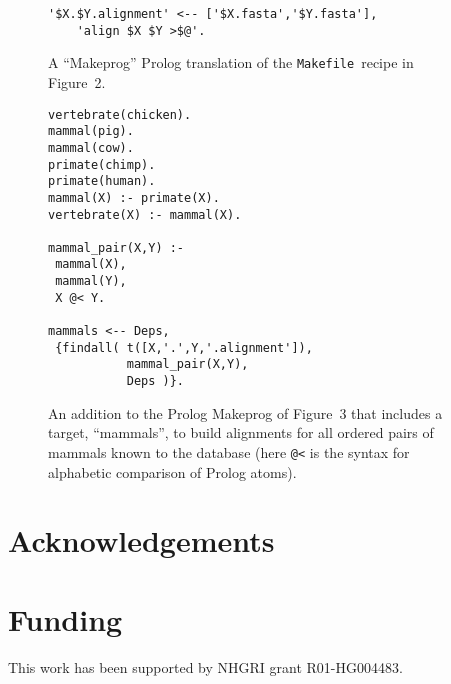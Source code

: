 \documentclass{bioinfo}
\newcommand\Makefile{{\tt Makefile}}
\begin{document}
\begin{figure}
\begin{Verbatim}[frame=single]
'$X.$Y.alignment' <-- ['$X.fasta','$Y.fasta'],
    'align $X $Y >$@'.
\end{Verbatim}
\caption{
  A ``Makeprog'' Prolog translation of the \Makefile\ recipe in Figure~2.
}
\end{figure}

\begin{figure}
\begin{Verbatim}[frame=single]
vertebrate(chicken).
mammal(pig).
mammal(cow).
primate(chimp).
primate(human).
mammal(X) :- primate(X).
vertebrate(X) :- mammal(X).

mammal_pair(X,Y) :-
 mammal(X),
 mammal(Y),
 X @< Y.

mammals <-- Deps, 
 {findall( t([X,'.',Y,'.alignment']),
           mammal_pair(X,Y),
           Deps )}.
\end{Verbatim}
\caption{
  An addition to the Prolog Makeprog of Figure~3 that includes a target, ``mammals'', to build alignments
  for all ordered pairs of mammals known to the database (here {\tt @<} is the syntax for alphabetic comparison of Prolog atoms).
}
\end{figure}

\section*{Acknowledgements}

\section*{Funding}

This work has been supported by NHGRI grant R01-HG004483.


%
%
%
%
%
%
%
%



\end{document}
